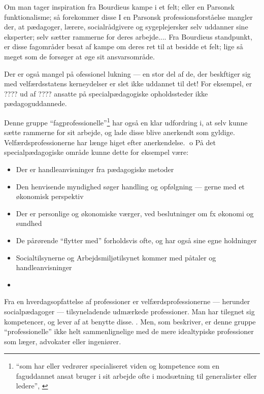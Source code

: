 
Om man tager inspiration fra Bourdieus kampe i et felt; eller en Parsonsk funktionalisme; så forekommer disse 
I en Parsonsk professionsforståelse mangler der, at pædagoger, lærere, socialrådgivere og sygeplejersker selv uddanner sine eksperter; selv sætter rammerne for deres arbejde....
Fra Bourdieus standpunkt, er disse fagområder besat af kampe om deres ret til at besidde et felt; lige så meget som de forsøger at øge sit ansvarsområde.

Der er også mangel på ofessionel lukning — en stor del af de, der beskftiger sig med velfærdsstatens kerneydelser er slet ikke uddannet til det! For eksempel, er ???? ud af ???? ansatte på specialpædagogiske opholdssteder ikke pædagoguddannede.

Denne gruppe “fagprofessionelle”\footnote{“som har eller vedrører specialiseret viden og kompetence som en faguddannet ansat bruger i sit arbejde ofte i modsætning til generalister eller ledere”, \autocite{FagprofessionelDanskeOrdbog}} har også en klar udfordring i, at selv kunne sætte rammerne for sit arbejde, og lade disse blive anerkendt som gyldige.
Velfærdsprofessionerne har længe higet efter anerkendelse.
o
På det specialpædagogiske område kunne dette for eksempel være:
\begin{itemize}
  \item
    Der er handleanvisninger fra pædagogiske metoder
  \item
    Den henvisende myndighed søger handling og opfølgning — gerne med et økonomisk perspektiv
  \item
    Der er personlige og økonomiske værger, ved beslutninger om fx økonomi og sundhed
  \item
    De pårørende “flytter med” forholdsvis ofte, og har også sine egne holdninger
  \item
    Socialtilsynerne og Arbejdsmiljøtilsynet kommer med påtaler og handleanvisninger
  \item
\end{itemize}


Fra en hverdagsopfattelse af professioner er velfærdsprofessionerne — herunder socialpædagoger — tilsyneladende udmærkede professioner. Man har tilegnet sig kompetencer, og lever af at benytte disse. \autocite[ss. 443-444]{frederiksenVelfaerdsprofessionerMellemOmsorg2017}.
Men, som \citeauthor{frederiksenVelfaerdsprofessionerMellemOmsorg2017} beskriver, er denne gruppe “professionelle” ikke helt sammenlignelige med de mere idealtypiske professioner som læger, advokater eller ingeniører.

